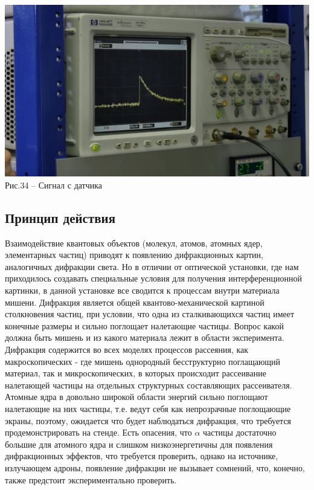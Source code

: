 \documentclass[11pt]{report}
\begin{document}
\includegraphics[scale=0.22]{ust_a_7}\\
Рис.34 -- Сигнал с датчика\\

\subsection{Принцип действия} 
Взаимодействие квантовых объектов (молекул, атомов, атомных ядер, элементарных частиц) приводят к появлению дифракционных картин, аналогичных дифракции света. Но в отличии от оптической установки, где нам приходилось создавать специальные условия для получения интерференционной картинки, в данной установке все сводится к процессам внутри материала мишени. Дифракция является общей квантово-механической картиной столкновения частиц, при условии, что одна из сталкивающихся частиц имеет конечные размеры и сильно поглощает налетающие частицы. Вопрос какой должна быть мишень и из какого материала лежит в области эксперимента. Дифракция содержится во всех моделях процессов рассеяния, как макроскопических - где мишень однородный бесструктурно поглащающий материал, так и микроскопических, в которых происходит рассеивание налетающей частицы на отдельных структурных составляющих рассеивателя.\\

Атомные ядра в довольно широкой области энергий сильно поглощают налетающие на них частицы, т.е. ведут себя как непрозрачные поглощающие экраны, поэтому, ожидается что будет наблюдаться дифракция, что требуется продемонстрировать на стенде. Есть опасения, что $\alpha$ частицы достаточно большие для атомного ядра и слишком низкоэнергетичны для появления дифракционных эффектов, что требуется проверить, однако на источнике, излучающем адроны, появление дифракции не вызывает сомнений, что, конечно, также предстоит экспериментально проверить. \\
\end{document}

